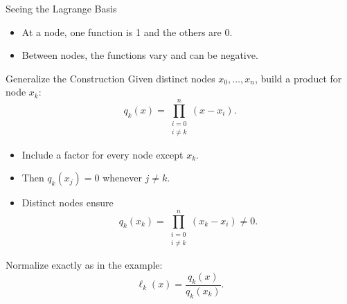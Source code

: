 \documentclass[10pt]{beamer}
\begin{document}
\begin{frame}{Seeing the Lagrange Basis}
\begin{center}
\end{center}
\begin{itemize}
    \item At a node, one function is 1 and the others are 0.
    \item Between nodes, the functions vary and can be negative.
\end{itemize}
\end{frame}

\begin{frame}{Generalize the Construction}
Given distinct nodes $x_0,\ldots,x_n$, build a product for node $x_k$:
\[
q_k(x)=\prod_{\substack{i=0\\i\ne k}}^n(x-x_i).
\]
\begin{itemize}
    \item Include a factor for every node except $x_k$.
    \item Then $q_k(x_j)=0$ whenever $j\ne k$.
    \item Distinct nodes ensure
    \[
    q_k(x_k)=\prod_{\substack{i=0\\i\ne k}}^n(x_k-x_i)\ne0.
    \]
\end{itemize}
Normalize exactly as in the example:
\[
\ell_k(x)=\frac{q_k(x)}{q_k(x_k)}.
\]
\end{frame}
\end{document}
